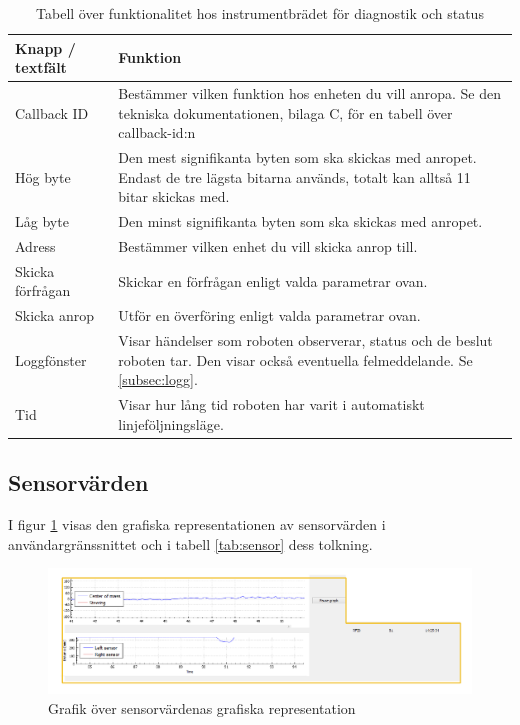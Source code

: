 \documentclass[a4paper,12pt]{article}
\begin{document}
\begin{table}[H]
    \centering
    \begin{tabularx}{\textwidth}{|l|X|}
        \hline \textbf{Knapp / textfält} & \textbf{Funktion} \\ \hline
        Callback ID & Bestämmer vilken funktion hos enheten du vill anropa. Se den tekniska dokumentationen, bilaga C, för en tabell över callback-id:n \\ \hline
        Hög byte & Den mest signifikanta byten som ska skickas med anropet. Endast de tre lägsta bitarna används, totalt kan alltså 11 bitar skickas med. \\ \hline
        Låg byte & Den minst signifikanta byten som ska skickas med anropet. \\ \hline
        Adress & Bestämmer vilken enhet du vill skicka anrop till. \\ \hline
        Skicka förfrågan & Skickar en förfrågan enligt valda parametrar ovan. \\ \hline
        Skicka anrop & Utför en överföring enligt valda parametrar ovan. \\ \hline
        Loggfönster & Visar händelser som roboten observerar, status och de beslut roboten tar. Den visar också eventuella felmeddelande. Se \ref{subsec:logg}.\\ \hline
        Tid & Visar hur lång tid roboten har varit i automatiskt linjeföljningsläge. \\ \hline
    \end{tabularx}
\caption{Tabell över funktionalitet hos instrumentbrädet för diagnostik och status}
\label{tab:diag}
\end{table}

\subsection{Sensorvärden}
\label{subsec:sensor}
I figur \ref{fig:pc_sensor} visas den grafiska representationen av sensorvärden i användargränssnittet och i tabell \ref{tab:sensor} dess tolkning.

\begin{figure}[H]
	\centering
	\includegraphics[width=1.0\textwidth]{sensor.pdf}
	\caption{Grafik över sensorvärdenas grafiska representation}
	\label{fig:pc_sensor}
\end{figure}
\end{document}
